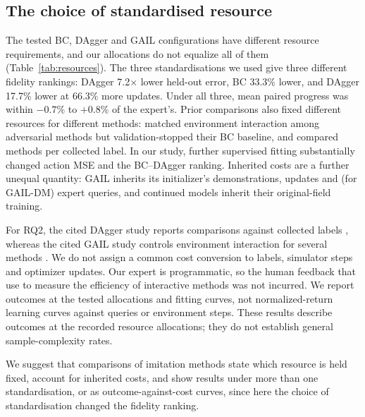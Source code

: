 \documentclass[conference]{IEEEtran}
\begin{document}
\subsection{The choice of standardised resource}
The tested BC, DAgger and GAIL configurations have different resource requirements, and our allocations do not equalize all of them (Table~\ref{tab:resources}). The three standardisations we used give three different fidelity rankings: DAgger 7.2$\times$ lower held-out error, BC 33.3\% lower, and DAgger 17.7\% lower at 66.3\% more updates. Under all three, mean paired progress was within $-0.7$\% to $+0.8$\% of the expert's. Prior comparisons also fixed different resources for different methods: \citet{ho2016} matched environment interaction among adversarial methods but validation-stopped their BC baseline, and \citet{ross2011} compared methods per collected label. In our study, further supervised fitting substantially changed action MSE and the BC--DAgger ranking. Inherited costs are a further unequal quantity: GAIL inherits its initializer's demonstrations, updates and (for GAIL-DM) expert queries, and continued models inherit their original-field training.

For RQ2, the cited DAgger study reports comparisons against collected labels \citep{ross2011}, whereas the cited GAIL study controls environment interaction for several methods \citep{ho2016}. We do not assign a common cost conversion to labels, simulator steps and optimizer updates. Our expert is programmatic, so the human feedback that \citet{celemin2022} use to measure the efficiency of interactive methods was not incurred. We report outcomes at the tested allocations and fitting curves, not normalized-return learning curves against queries or environment steps. These results describe outcomes at the recorded resource allocations; they do not establish general sample-complexity rates.

We suggest that comparisons of imitation methods state which resource is held fixed, account for inherited costs, and show results under more than one standardisation, or as outcome-against-cost curves, since here the choice of standardisation changed the fidelity ranking.
\end{document}
